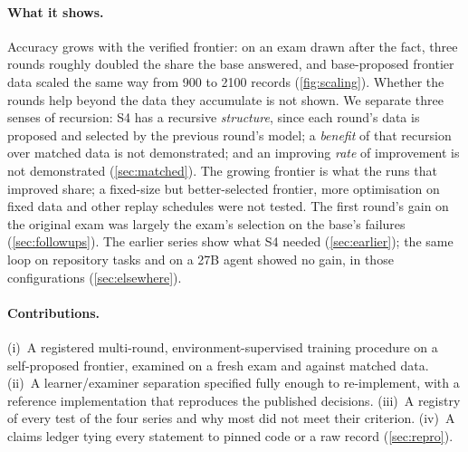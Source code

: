 \paragraph{What it shows.} Accuracy grows with the verified frontier: on an exam drawn after the
fact, three rounds roughly doubled the share the base answered, and base-proposed frontier data scaled
the same way from 900 to 2100 records (\cref{fig:scaling}). Whether the rounds help beyond
the data they accumulate is not shown. We separate three senses of recursion: S4 has a recursive
\emph{structure}, since each round's data is proposed and selected by the previous round's model; a
\emph{benefit} of that recursion over matched data is not demonstrated; and an improving \emph{rate} of
improvement is not demonstrated (\cref{sec:matched}). The growing frontier is what the runs that improved
share; a fixed-size but better-selected frontier, more optimisation on fixed
data and other replay schedules were not tested. The first round's gain on the original exam was largely
the exam's selection on the base's failures (\cref{sec:followups}). The earlier series show what S4 needed
(\cref{sec:earlier}); the same loop on repository tasks and on a 27B agent showed no gain, in those
configurations (\cref{sec:elsewhere}).

\paragraph{Contributions.} (i)~A registered multi-round, environment-supervised training procedure on a
self-proposed frontier, examined on a fresh exam and against matched data. (ii)~A learner/examiner
separation specified fully enough to re-implement, with a reference implementation that reproduces the
published decisions. (iii)~A registry of every test of the four series and why most did not meet their
criterion. (iv)~A claims ledger tying every statement to pinned code or a raw record (\cref{sec:repro}).
